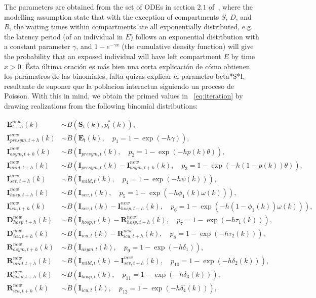\documentclass[a4paper]{article}
\renewcommand{\vec}[1]{\boldsymbol{#1}}
\theoremstyle{remark}
\begin{document}
The parameters are obtained from the set of ODEs in section $2.1$ of~\cite{abrams21}, where the modelling assumption state that with the exception of compartments $S$, $D$, and $R$, the waiting times within compartments are all exponentially distributed, e.g. the latency period (of an individual in $E$) follows an exponential distribution with a constant parameter $\gamma$, and $1-e^{-\gamma x}$ (the cumulative density function) will give the probability that an exposed individual will have left compartment $E$ by time $x>0$. {\color{red} Ésta última oración es más bien una corta explicación de cómo obtienen los parámatros de las binomiales, falta quizas explicar el parametro beta*S*I, resultante de suponer que la poblacion interactua siguiendo un proceso de Poisson}. With this in mind, we obtain the primed values in ~\ref{eq:iteration} by drawing realizations from the following binomial distributions:

\begin{equation} \label{eq:ownbinomials}
\begin{split}
    \vec{E}_{t+h}^{new}(k)&\sim B(\vec{S}_t(k),p_t^*(k)), \\
    \vec{I}_{presym,t+h}^{new}(k)&\sim B(\vec{E}_t(k),\quad p_1=1-\exp(-h\gamma)), \\
    \vec{I}_{asym,t+h}^{new}(k)&\sim B(\vec{I}_{presym,t}(k),\quad p_2=1-\exp(-hp(k)\theta)), \\
    \vec{I}_{mild,t+h}^{new}(k)&\sim B(\vec{I}_{presym,t}(k)-\vec{I}_{asym,t+h}^{new}(k),\quad p_3=1-\exp(-h(1-p(k))\theta)), \\
    \vec{I}_{sev,t+h}^{new}(k)&\sim B(\vec{I}_{mild,t}(k),\quad p_4=1-\exp(-h\psi(k))), \\
    \vec{I}_{hosp,t+h}^{new}(k)&\sim B(\vec{I}_{sev,t}(k),\quad p_5=1-\exp(-h\phi_1(k)\omega(k))), \\
    \vec{I}_{icu,t+h}^{new}(k)&\sim B(\vec{I}_{sev,t}(k)-\vec{I}_{hosp,t+h}^{new}(k),\quad p_6=1-\exp(-h(1-\phi_1(k))\omega(k))), \\
    \vec{D}_{hosp,t+h}^{new}(k)&\sim B(\vec{I}_{hosp,t}(k)-\vec{R}_{hosp,t+h}^{new}(k),\quad p_7=1-\exp(-h\tau_1(k))), \\
    \vec{D}_{icu,t+h}^{new}(k)&\sim B(\vec{I}_{icu,t}(k)-\vec{R}_{icu,t+h}^{new}(k),\quad p_8=1-\exp(-h\tau_2(k))), \\
    \vec{R}_{asym,t+h}^{new}(k)&\sim B(\vec{I}_{asym,t}(k),\quad p_9=1-\exp(-h\delta_1)), \\
    \vec{R}_{mild,t+h}^{new}(k)&\sim B(\vec{I}_{mild,t}(k)-\vec{I}_{sev,t+h}^{new}(k),\quad p_{10}=1-\exp(-h\delta_2(k))), \\
    \vec{R}_{hosp,t+h}^{new}(k)&\sim B(\vec{I}_{hosp,t}(k),\quad p_{11}=1-\exp(-h\delta_3(k))), \\
    \vec{R}_{icu,t+h}^{new}(k)&\sim B(\vec{I}_{icu,t}(k),\quad p_{12}=1-\exp(-h\delta_4(k))), \\
\end{split}
\end{equation}
\end{document}
